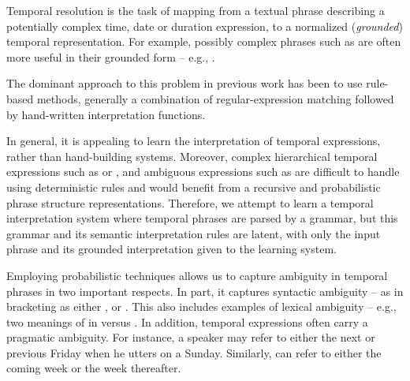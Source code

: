 
Temporal resolution is the task of mapping from a textual phrase describing
	a potentially complex time, date or duration expression, to a normalized
	(\textit{grounded}) temporal representation.
For example, possibly complex phrases such as  are
	often more useful in their grounded form -- e.g., .


The dominant approach to this problem in previous work has been to use
	rule-based methods, generally a combination of regular-expression matching
	followed by hand-written interpretation functions.

In general, it is appealing to learn the interpretation of temporal expressions,
	rather than hand-building systems.
Moreover, complex hierarchical temporal expressions such as 
	 or ,
	and ambiguous expressions such as  are difficult to
	handle using deterministic rules and would benefit from a
	recursive and probabilistic phrase structure representations.
Therefore, we attempt to learn
	a temporal interpretation system where temporal phrases are parsed by
	a grammar, but this grammar and its semantic interpretation rules are
	latent, with only the input phrase and its grounded interpretation given
	to the learning system.

Employing probabilistic techniques allows us to capture ambiguity in temporal 
	phrases in two important respects.
In part, it captures syntactic ambiguity -- as in  bracketing as either , or
	.
This also includes examples of lexical ambiguity -- e.g., two
	meanings of  in  versus .
In addition, temporal expressions often carry a pragmatic ambiguity.
For instance, a speaker may refer to either the next or previous Friday
	when he utters  on a Sunday.
Similarly,  can refer to either the coming week or the week
	thereafter.

